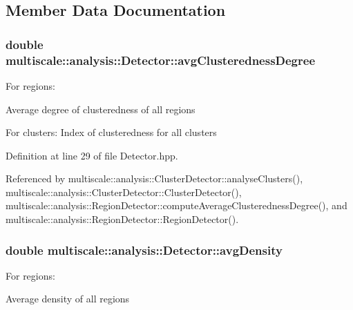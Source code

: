 \subsection{Member Data Documentation}
\hypertarget{classmultiscale_1_1analysis_1_1Detector_a6d06607ae468a56e48f8daba0a00df5b}{
\subsubsection[{avg\-Clusteredness\-Degree}]{\setlength{\rightskip}{0pt plus 5cm}double multiscale\-::analysis\-::\-Detector\-::avg\-Clusteredness\-Degree\hspace{0.3cm}{\ttfamily [protected]}}}\label{classmultiscale_1_1analysis_1_1Detector_a6d06607ae468a56e48f8daba0a00df5b}
\begin{DoxyVerb}      For regions:
\end{DoxyVerb}
 Average degree of clusteredness of all regions

For clusters\-: Index of clusteredness for all clusters 

Definition at line 29 of file Detector.\-hpp.



Referenced by multiscale\-::analysis\-::\-Cluster\-Detector\-::analyse\-Clusters(), multiscale\-::analysis\-::\-Cluster\-Detector\-::\-Cluster\-Detector(), multiscale\-::analysis\-::\-Region\-Detector\-::compute\-Average\-Clusteredness\-Degree(), and multiscale\-::analysis\-::\-Region\-Detector\-::\-Region\-Detector().

\hypertarget{classmultiscale_1_1analysis_1_1Detector_a411629d4cf34809127662d625ba057c0}{
\subsubsection[{avg\-Density}]{\setlength{\rightskip}{0pt plus 5cm}double multiscale\-::analysis\-::\-Detector\-::avg\-Density\hspace{0.3cm}{\ttfamily [protected]}}}\label{classmultiscale_1_1analysis_1_1Detector_a411629d4cf34809127662d625ba057c0}
\begin{DoxyVerb}                  For regions:
\end{DoxyVerb}
 Average density of all regions

